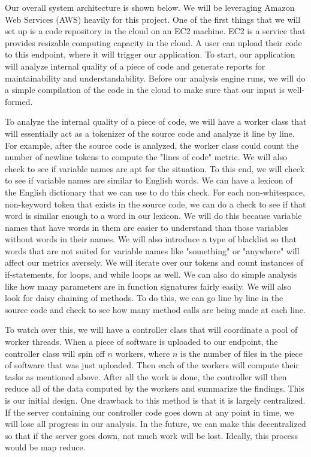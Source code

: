 \documentclass{sig-alternate}
\begin{document}
Our overall system architecture is shown below. We will be leveraging Amazon Web Services (AWS) heavily for this project. One of the first things that we will set up is a code repository in the cloud on an EC2 machine. EC2 is a service that provides resizable computing capacity in the cloud. A user can upload their code to this endpoint, where it will trigger our application. To start, our application will analyze internal quality of a piece of code and generate reports for maintainability and understandability. Before our analysis engine runs, we will do a simple compilation of the code in the cloud to make sure that our input is well-formed.

To analyze the internal quality of a piece of code, we will have a worker class that will essentially act as a tokenizer of the source code and analyze it line by line. For example, after the source code is analyzed, the worker class could count the number of newline tokens to compute the "lines of code" metric. We will also check to see if variable names are apt for the situation. To this end, we will check to see if variable names are similar to English words. We can have a lexicon of the English dictionary that we can use to do this check. For each non-whitespace, non-keyword token that exists in the source code, we can do a check to see if that word is similar enough to a word in our lexicon. We will do this because variable names that have words in them are easier to understand than those variables without words in their names. We will also introduce a type of blacklist so that words that are not suited for variable names like "something" or "anywhere" will affect our metrics aversely. We will iterate over our tokens and count instances of if-statements, for loops, and while loops as well. We can also do simple analysis like how many parameters are in function signatures fairly easily. We will also look for daisy chaining of methods. To do this, we can go line by line in the source code and check to see how many method calls are being made at each line. 

To watch over this, we will have a controller class that will coordinate a pool of worker threads. When a piece of software is uploaded to our endpoint, the controller class will spin off $n$ workers, where $n$ is the number of files in the piece of software that was just uploaded. Then each of the workers will compute their tasks as mentioned above. After all the work is done, the controller will then reduce all of the data computed by the workers and summarize the findings. This is our initial design. One drawback to this method is that it is largely centralized. If the server containing our controller code goes down at any point in time, we will lose all progress in our analysis. In the future, we can make this decentralized so that if the server goes down, not much work will be lost. Ideally, this process would be map reduce.
\end{document}
